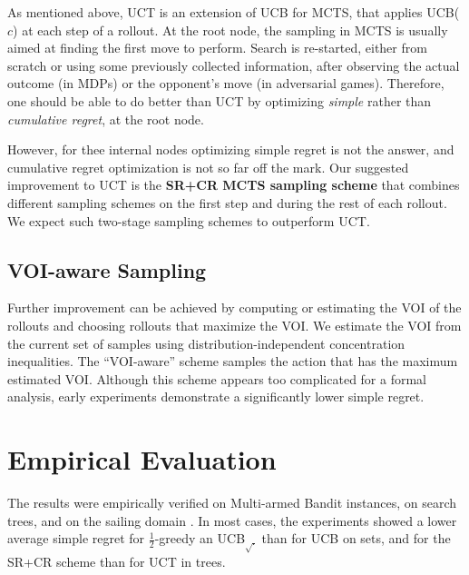 \documentclass[letterpaper]{article}
\begin{document}
As mentioned above, UCT \cite{Kocsis.uct} is an extension of UCB for
MCTS, that applies UCB($c$) at each step of a rollout.  At the root
node, the sampling in MCTS is usually aimed at finding the first move
to perform. Search is re-started, either from scratch or using some
previously collected information, after observing the actual outcome
(in MDPs) or the opponent's move (in adversarial games). Therefore,
one should be able to do better than UCT by optimizing {\em simple}
rather than {\em cumulative regret}, at the root node.

However, for thee internal nodes optimizing simple regret is not the
answer, and cumulative regret optimization is not so far off the
mark. Our suggested improvement to UCT is the \textbf{SR+CR MCTS
sampling scheme} that combines different sampling schemes on the first
step and during the rest of each rollout.  We expect such two-stage
sampling schemes to outperform UCT.


\subsection{VOI-aware Sampling}
\label{sec:voi-sampling}

Further improvement can be achieved by computing or estimating the
VOI of the rollouts and choosing rollouts that
maximize the VOI. We estimate the VOI from
the current set of samples using distribution-independent concentration inequalities.
The ``VOI-aware'' scheme samples the action that has the maximum
estimated VOI.  Although this scheme appears too complicated for
a formal analysis, early experiments demonstrate a significantly lower
simple regret.


\section{Empirical Evaluation}
\label{sec:emp}

The results were empirically verified on Multi-armed Bandit instances,
on search trees, and on the sailing domain
\cite{Kocsis.uct}. In most cases, the experiments showed a lower average
simple regret for $\frac 1 2$-greedy an UCB$_{\sqrt{\cdot}}$ than for
UCB on sets, and for the SR+CR scheme than for UCT in trees.
\end{document}
